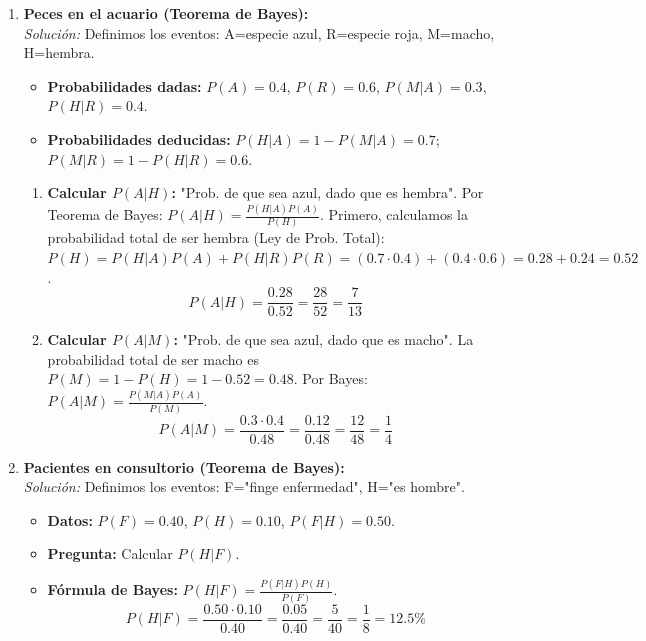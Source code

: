 \documentclass[12pt, letterpaper]{article}
\begin{document}
\begin{enumerate}
	\item \textbf{Peces en el acuario (Teorema de Bayes):} \\
	      \textit{Solución:} Definimos los eventos: A=especie azul, R=especie roja, M=macho, H=hembra.
	      \begin{itemize}
		      \item \textbf{Probabilidades dadas:} $P(A)=0.4$, $P(R)=0.6$, $P(M|A)=0.3$, $P(H|R)=0.4$.
		      \item \textbf{Probabilidades deducidas:} $P(H|A) = 1 - P(M|A) = 0.7$; $P(M|R) = 1 - P(H|R) = 0.6$.
	      \end{itemize}
	      \begin{enumerate}
		      \item \textbf{Calcular $P(A|H)$:} "Prob. de que sea azul, dado que es hembra".
		            Por Teorema de Bayes: $P(A|H) = \frac{P(H|A)P(A)}{P(H)}$.
		            Primero, calculamos la probabilidad total de ser hembra (Ley de Prob. Total):
		            $P(H) = P(H|A)P(A) + P(H|R)P(R) = (0.7 \cdot 0.4) + (0.4 \cdot 0.6) = 0.28 + 0.24 = 0.52$.
		            \[ P(A|H) = \frac{0.28}{0.52} = \frac{28}{52} = \frac{7}{13} \]
		      \item \textbf{Calcular $P(A|M)$:} "Prob. de que sea azul, dado que es macho".
		            La probabilidad total de ser macho es $P(M) = 1 - P(H) = 1 - 0.52 = 0.48$.
		            Por Bayes: $P(A|M) = \frac{P(M|A)P(A)}{P(M)}$.
		            \[ P(A|M) = \frac{0.3 \cdot 0.4}{0.48} = \frac{0.12}{0.48} = \frac{12}{48} = \frac{1}{4} \]
	      \end{enumerate}

	\item \textbf{Pacientes en consultorio (Teorema de Bayes):} \\
	      \textit{Solución:} Definimos los eventos: F="finge enfermedad", H="es hombre".
	      \begin{itemize}
		      \item \textbf{Datos:} $P(F)=0.40$, $P(H)=0.10$, $P(F|H)=0.50$.
		      \item \textbf{Pregunta:} Calcular $P(H|F)$.
		      \item \textbf{Fórmula de Bayes:} $P(H|F) = \frac{P(F|H)P(H)}{P(F)}$.
		            \[ P(H|F) = \frac{0.50 \cdot 0.10}{0.40} = \frac{0.05}{0.40} = \frac{5}{40} = \frac{1}{8} = 12.5\% \]
	      \end{itemize}


\end{enumerate}
\end{document}
